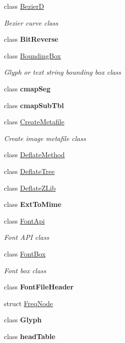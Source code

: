\begin{DoxyCompactItemize}
class \hyperlink{class_pdf_file_writer_1_1_bezier_d}{BezierD}
\begin{DoxyCompactList}\small\item\em Bezier curve class \end{DoxyCompactList}\item 
class {\bfseries Bit\+Reverse}
\item 
class \hyperlink{class_pdf_file_writer_1_1_bounding_box}{Bounding\+Box}
\begin{DoxyCompactList}\small\item\em Glyph or text string bounding box class \end{DoxyCompactList}\item 
class {\bfseries cmap\+Seg}
\item 
class {\bfseries cmap\+Sub\+Tbl}
\item 
class \hyperlink{class_pdf_file_writer_1_1_create_metafile}{Create\+Metafile}
\begin{DoxyCompactList}\small\item\em Create image metafile class \end{DoxyCompactList}\item 
class \hyperlink{class_pdf_file_writer_1_1_deflate_method}{Deflate\+Method}
\item 
class \hyperlink{class_pdf_file_writer_1_1_deflate_tree}{Deflate\+Tree}
\item 
class \hyperlink{class_pdf_file_writer_1_1_deflate_z_lib}{Deflate\+Z\+Lib}
\item 
class {\bfseries Ext\+To\+Mime}
\item 
class \hyperlink{class_pdf_file_writer_1_1_font_api}{Font\+Api}
\begin{DoxyCompactList}\small\item\em Font A\+PI class \end{DoxyCompactList}\item 
class \hyperlink{class_pdf_file_writer_1_1_font_box}{Font\+Box}
\begin{DoxyCompactList}\small\item\em Font box class \end{DoxyCompactList}\item 
class {\bfseries Font\+File\+Header}
\item 
struct \hyperlink{struct_pdf_file_writer_1_1_freq_node}{Freq\+Node}
\item 
class {\bfseries Glyph}
\item 
class {\bfseries head\+Table}
\item 

\end{DoxyCompactItemize}
